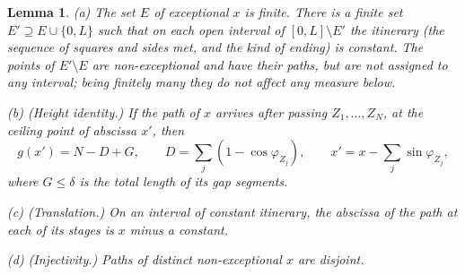 \documentclass[11pt,letterpaper]{amsart}
\theoremstyle{plain}
\newtheorem{lemma}[theorem]{Lemma}
\theoremstyle{definition}
\theoremstyle{remark}
\begin{document}
\begin{lemma}\label{lem:vstructure}
\textup{(a)} The set $E$ of exceptional $x$ is finite. There is a finite set $E'\supseteq E\cup\{0,L\}$ such that on each open interval of $[0,L]\setminus E'$ the itinerary (the sequence of squares and sides met, and the kind of ending) is constant. The points of $E'\setminus E$ are non-exceptional and have their paths, but are not assigned to any interval; being finitely many they do not affect any measure below.

\textup{(b)} (Height identity.) If the path of $x$ arrives after passing $Z_1,\ldots,Z_N$, at the ceiling point of abscissa $x'$, then
\begin{equation}\label{eq:vheight}
g(x')=N-D+G,\qquad D=\sum_j(1-\cos\varphi_{Z_j}),\qquad x'=x-\sum_j\sin\varphi_{Z_j},
\end{equation}
where $G\le\delta$ is the total length of its gap segments.

\textup{(c)} (Translation.) On an interval of constant itinerary, the abscissa of the path at each of its stages is $x$ minus a constant.

\textup{(d)} (Injectivity.) Paths of distinct non-exceptional $x$ are disjoint.
\end{lemma}
\end{document}
